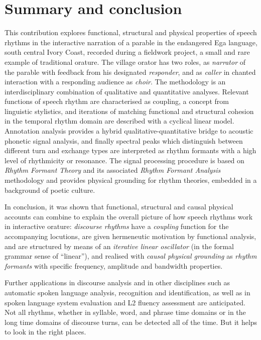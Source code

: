 \documentclass[output=paper,colorlinks,citecolor=brown]{langscibook}
\begin{document}
\section{Summary and conclusion}\label{sec:gibbon:conclusion}
\begin{sloppypar}
This contribution explores functional, structural and physical properties of speech rhythms in the interactive narration of a parable in the endangered Ega language, south central Ivory Coast, recorded during a fieldwork project, a small and rare example of traditional orature. The village orator has two roles, as \textit{narrator} of the parable with feedback from his designated \textit{responder}, and as \textit{caller} in chanted interaction with a responding audience as \textit{choir}.  The methodology is an interdisciplinary combination of qualitative and quantitative analyses. Relevant functions of speech rhythm are characterised as coupling, a concept from linguistic stylistics, and iterations of matching functional and structural cohesion in the temporal rhythm domain are described with a cyclical linear model. Annotation analysis provides a hybrid qualitative-quantitative bridge to acoustic phonetic signal analysis, and finally spectral peaks which distinguish between different turn and exchange types are interpreted as rhythm formants with a high level of rhythmicity or resonance. The signal processing procedure is based on \textit{Rhythm Formant Theory} and its associated \textit{Rhythm Formant Analysis} methodology and provides physical grounding for rhythm theories, embedded in a background of poetic culture.
\end{sloppypar}

In conclusion, it was shown that functional, structural and causal physical accounts can combine to explain the overall picture of how speech rhythms work in interactive orature: \textit{discourse rhythms} have a \textit{coupling} function for the accompanying locutions, are given hermeneutic motivation by functional analysis, and are structured by means of an \textit{iterative linear oscillator} (in the formal grammar sense of “linear”), and realised with \textit{causal physical grounding} as \textit{rhythm formants} with specific frequency, amplitude and bandwidth properties.

Further applications in discourse analysis and in other disciplines such as automatic spoken language analysis, recognition and identification, as well as in spoken language system evaluation and L2 fluency assessment are anticipated. Not all rhythms, whether in syllable, word, and phrase time domains or in the long time domains of discourse turns, can be detected all of the time. But it helps to look in the right places.
\end{document}
